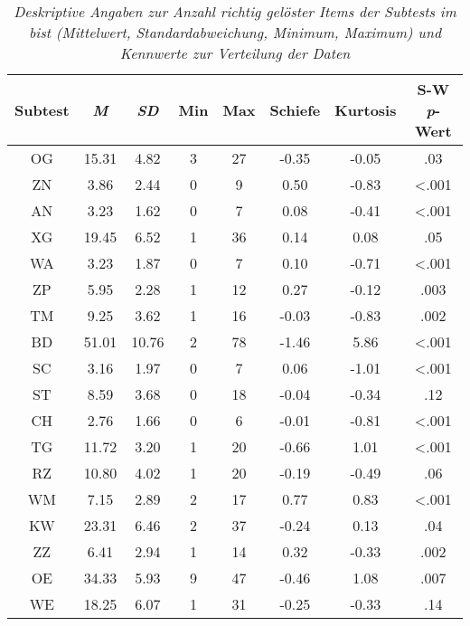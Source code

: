\documentclass[11pt, twoside, a4paper]{book}		%
\begin{document}
\begin{table}[htbp]
	\centering
	\captionsetup{labelsep = none}
	\caption[Deskriptive Angaben zur ]{\newline  \textit{Deskriptive Angaben zur Anzahl richtig gelöster Items der Subtests im \gls{bist} (Mittelwert, Standardabweichung, Minimum, Maximum) und Kennwerte zur Verteilung der Daten} \vspace{.2cm}}
	\label{tab:BISdescriptives}
	\begin{threeparttable}
		
		\begin{tabular}{
				c
				S[table-format = 2.2]
				S[table-format = 2.2]
				S[table-format = 1.0]
				S[table-format = 2.0]
				S[table-format = 1.2]
				S[table-format = 1.2]
				S[table-format = < 0.3, add-integer-zero=false]
				}
			\hline

			Subtest &  {\textit{M}}	& {\textit{SD}}	&	{Min}	&	{Max} 	& \textnormal{Schiefe}	& \textnormal{Kurtosis} & {S-W  \textit{p}-Wert}\\
			\hline
			OG		&	15.31		&	4.82		&	3		&	27		&	-0.35				&	-0.05					& 		.03			\\
			ZN		&	3.86		&	2.44		&	0		&	9		&	0.50				&	-0.83					& 		<.001			\\
			AN		&	3.23		&	1.62		&	0		&	7		&	0.08				&	-0.41					& 		<.001			\\
			XG		&	19.45		&	6.52		&	1		&	36		&	0.14				&	0.08					& 		.05			\\
			WA		&	3.23		&	1.87		&	0		&	7		&	0.10				&	-0.71					& 		<.001			\\
			ZP		&	5.95		&	2.28		&	1		&	12		&	0.27				&	-0.12					& 		.003			\\
			TM		&	9.25		&	3.62		&	1		&	16		&	-0.03				&	-0.83					& 		.002			\\
			BD		&	51.01		&	10.76		&	2		&	78		&	-1.46				&	5.86					& 		<.001			\\
			SC		&	3.16		&	1.97		&	0		&	7		&	0.06				&	-1.01					& 		<.001			\\
			ST		&	8.59		&	3.68		&	0		&	18		&	-0.04				&	-0.34					& 		.12			\\
			CH		&	2.76		&	1.66		&	0		&	6		&	-0.01				&	-0.81					& 		<.001			\\
			TG		&	11.72		&	3.20		&	1		&	20		&	-0.66				&	1.01					& 		<.001			\\
			RZ		&	10.80		&	4.02		&	1		&	20		&	-0.19				&	-0.49					& 		.06			\\
			WM		&	7.15		&	2.89		&	2		&	17		&	0.77				&	0.83					& 		<.001			\\
			KW		&	23.31		&	6.46		&	2		&	37		&	-0.24				&	0.13					& 		.04			\\
			ZZ		&	6.41		&	2.94		&	1		&	14		&	0.32				&	-0.33					& 		.002			\\
			OE		&	34.33		&	5.93		&	9		&	47		&	-0.46				&	1.08					& 		.007			\\
			WE		&	18.25		&	6.07		&	1		&	31		&	-0.25				&	-0.33					& 		.14			\\
			

\end{tabular}
\end{threeparttable}
\end{table}
\end{document}
